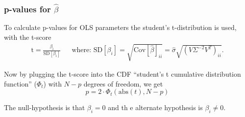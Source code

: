 \subsubsection{p-values for $\hat{\beta}$}

To calculate p-values for OLS parameters the student's t-distribution is used, with the t-score \cite[p.~172]{time-series-analysis}
\begin{align}
\mathrm{t} = \frac{\beta_i}{\mathrm{SD}[\beta_i]} && \text{where: } \mathrm{SD}[\beta_i] = \sqrt{\mathrm{Cov}[\hat{\beta}]_{ii}} = \hat{\sigma} \sqrt{ (V \Sigma^{-2} V^T)_{ii} }.
\end{align}

Now by plugging the t-score into the CDF ``student's t cumulative distribution function'' ($\Phi_t$) with $N - p$ degrees of freedom, we get
\begin{equation}
p = 2 \cdot \Phi_t\left(\mathrm{abs}(t), N-p\right)
\end{equation}

The null-hypothesis is that $\beta_i = 0$ and th  e alternate hypothesis is $\beta_i \not = 0$.
